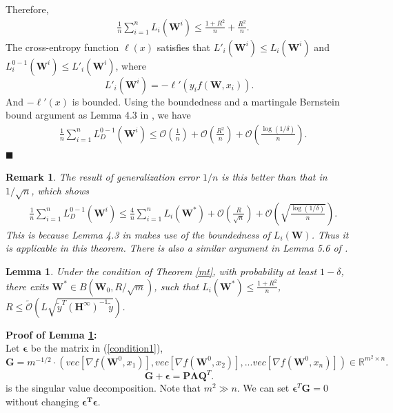 \documentclass{article}
\newcommand{\cO}{\mathcal{O}}
\newtheorem{lem}[theo]{\textbf{Lemma}}
\newtheorem{rem}{\textbf{Remark}}[section]
\newcommand*{\QEDA}{\hfill\ensuremath{\blacksquare}}%
\begin{document}
Therefore,
\begin{equation}
\begin{aligned}
&\frac{1}{n}\sum_{i=1}^n L_i(\bm{W}^{i})\leq  \frac{1+R^2}{n} +  \frac{R^2}{n}.
\end{aligned}
\end{equation}
The cross-entropy function $\ell(x)$ satisfies that $L'_i(\bm{W}^{i}) \leq L_i(\bm{W}^{i})$ and $L^{0-1}_i(\bm{W}^{i})\leq L'_i(\bm{W}^{i}) $, where
\begin{equation}
L'_i(\bm{W}^{i})=-\ell'(y_if(\bm{W},x_i)).
\end{equation}
And $-\ell'(x)$ is bounded. Using the boundedness and a martingale Bernstein bound argument as Lemma 4.3 in \cite{ji2020polylogarithmic}, we have
\begin{equation}
\begin{aligned}
&\frac{1}{n}\sum_{i=1}^n L^{0-1}_D(\bm{W}^{i})\leq   \cO(\frac{1}{ n})+\cO(\frac{R^2}{n})+\cO(\frac{\log(1/\delta)}{n}).
\end{aligned}
\end{equation}
\QEDA
\begin{rem}
The result of generalization error $1/n$ is this better than that in \cite{cao} $1/\sqrt{n}$, which shows
\begin{equation}
\begin{aligned}
&\frac{1}{n}\sum_{i=1}^n L^{0-1}_D(\bm{W}^{i})\leq  \frac{4}{n}\sum_{i=1}^nL_i(\bm{W}^*) +  \cO(\frac{R}{\sqrt{n}})+\cO(\sqrt{\frac{\log(1/\delta)}{n}}).
\end{aligned}
\end{equation}
This is because Lemma 4.3 in \cite{ji2020polylogarithmic}  makes use of the boundedness of $L_i(\bm{W})$. Thus it is  applicable in this theorem. There is also a similar argument in Lemma 5.6 of  \cite{chen2020overparameterization}.
\end{rem}


\begin{lem}\label{lem2}
Under the condition of Theorem \ref{mt}, with probability at least $1-\delta$, there exits $\bm{W}^* \in B(\bm{W}_0,R/\sqrt{m})$, such that $L_i(\bm{W}^*)\leq \frac{1+R^2}{n}$, $R\leq\widetilde{\cO}(L\sqrt{\widetilde{y}^T(\bm{H}^{\infty})^{-1}\widetilde{y}})$.
\end{lem}

{\bf Proof of Lemma \ref{lem2}:}\\
Let $\bm{\epsilon}$ be the matrix in (\ref{condition1}),
$$\bm{G}=m^{-1/2}\cdot (vec[\nabla f(\bm{W}^0,x_1)], vec[\nabla f(\bm{W}^0,x_2)],... vec[\nabla f(\bm{W}^0,x_n)])\in \mathbb{R}^{m^2\times n}.$$
 \begin{equation}\label{svd}
\bm{G}+\bm{\epsilon}=\bm{P}\bm{\Lambda}\bm{Q}^T.
\end{equation}
 is the singular value decomposition. Note that $m^2\gg n$. We can set $ \bm{\epsilon}^T \bm{G} =0$ without changing $\bm{\epsilon^T\epsilon}$.
\end{document}
